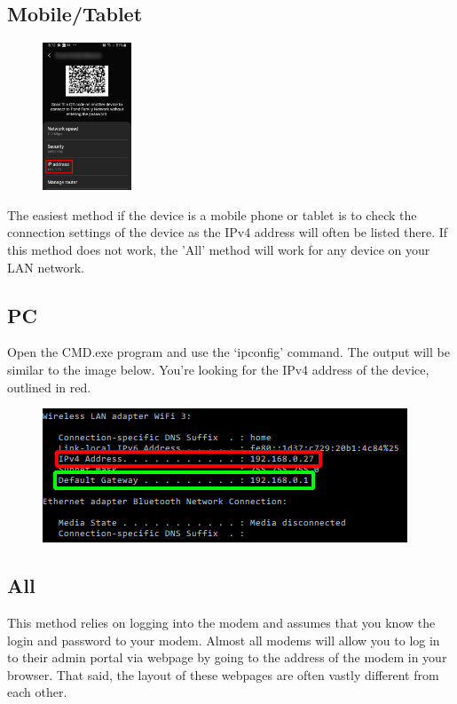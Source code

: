 \documentclass{article}
\begin{document}
        \subsection{Mobile/Tablet}
        \begin{figure}
            \vspace{-40pt}
            \includegraphics[width=100px]{images/mobile-ip.png}
        \end{figure}
        The easiest method if the device is a mobile phone or tablet
        is to check the connection settings of the device as the IPv4 address will often be listed there.
        If this method does not work, the 'All' method will work for any device on your LAN network.
        
        \subsection{PC} Open the CMD.exe program and use the `ipconfig' command. The output will be similar
        to the image below. You're looking for the IPv4 address of the device, outlined in red.
        \begin{figure}[h!]
            \includegraphics[width=\linewidth]{images/local-ip.png}
        \end{figure}
        
        \subsection{All}
        This method relies on logging into the modem and assumes that you know the login and
        password to your modem. Almost all modems will allow you to log in to their admin portal
        via webpage by going to the address of the modem in your browser. That said, the layout of
        these webpages are often vastly different from each other.
        
\end{document}

